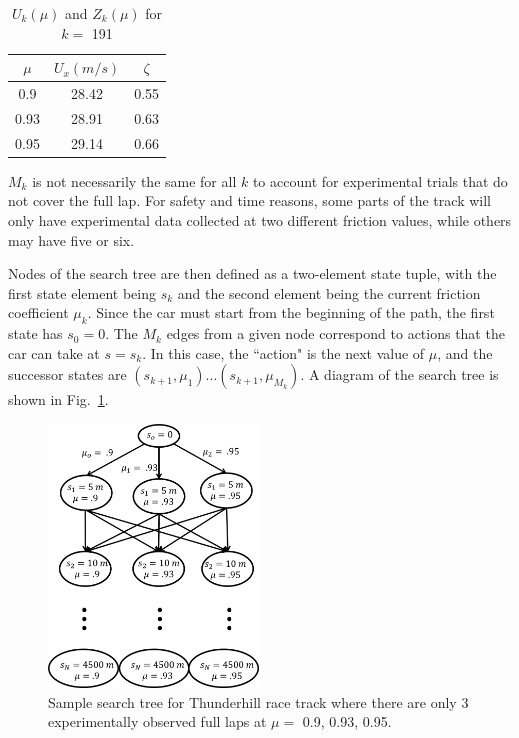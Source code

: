 \documentclass[9pt,shortpaper,twoside,web]{ieeecolor}
\begin{document}
\begin{table}[h]
\begin{center}
\caption{$U_k(\mu)$ and $Z_k(\mu)$ for $k =$ 191}\label{tb:laptimes}
\begin{tabular}{ccc}
\label{tb:Uk}
$\mu $&$ U_x(m/s) $& $\zeta $\\\hline
0.9 & 28.42 & 0.55\\
0.93& 28.91 & 0.63\\
0.95& 29.14 & 0.66\\\hline
\end{tabular}
\end{center}
\end{table} 
 $M_k$ is not necessarily the same for all $k$ to account for experimental trials that do not cover the full lap. For safety and time
 reasons, some parts of the track will only have experimental data collected at two different friction values, while others may have five or six.

 Nodes of the search tree are then defined as a two-element state tuple, with the first state element being $s_k$ and the second element being the current
 friction coefficient $\mu_k$. Since the car must start from the beginning of the path, the first state has $s_0 = 0$.
 The $M_k$ edges from a given node correspond to actions that the car can take at $s = s_k$. In this case, the ``action" is the next value of $\mu$,
 and the successor states are $(s_{k+1}, \mu_1) ... (s_{k+1}, \mu_{M_k})$. A diagram of the search tree is shown in Fig.~\ref{fig:stree}.

\begin{figure}
\centering
\includegraphics[width=2.2in]{figures/searchTree.png}
\caption{Sample search tree for Thunderhill race track where there are only 3 experimentally observed full laps at $\mu =$ 0.9, 0.93, 0.95.}
\label{fig:stree}
\end{figure} 
\end{document}
